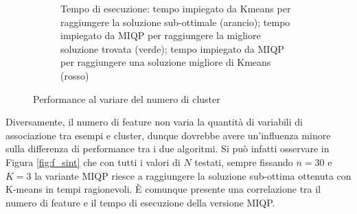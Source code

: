 \documentclass{article}
\begin{document}
\begin{figure}[H]
\begin{subfigure}[t]{0.49\linewidth}
         \caption{Tempo di esecuzione: tempo impiegato da Kmeans per raggiungere la soluzione sub-ottimale (arancio); tempo impiegato da MIQP per raggiungere la migliore soluzione trovata (verde); tempo impiegato da MIQP per raggiungere una soluzione migliore di Kmeans (rosso)}
     \end{subfigure}
        \caption{Performance al variare del numero di cluster}
        \label{fig:k_sint}
     \end{figure}
    Diversamente, il numero di feature non varia la quantità di variabili di associazione tra esempi e cluster, dunque dovrebbe avere un'influenza minore sulla differenza di performance tra i due algoritmi. Si può infatti osservare in Figura \ref{fig:f_sint} che con tutti i valori di $N$ testati, sempre fissando $n=30$ e $K=3$ la variante MIQP riesce a raggiungere la soluzione sub-ottima ottenuta con K-means in tempi ragionevoli. È comunque presente una correlazione tra il numero di feature e il tempo di esecuzione della versione MIQP.\\
\end{document}
